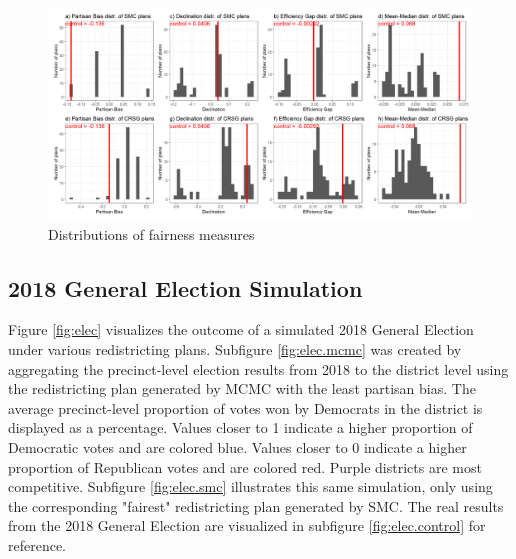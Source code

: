 
\begin{landscape}
    \begin{figure}
     \centering
     \includegraphics{img/fair_hist.png}
     \caption{Distributions of fairness measures}
     \label{fig:fair_hist}
    \end{figure}
   \end{landscape}

\subsection{2018 General Election Simulation}


Figure \ref{fig:elec} visualizes the outcome of a simulated 2018 General Election under various redistricting plans. Subfigure \ref{fig:elec.mcmc} was created by aggregating the precinct-level election results from 2018 to the district level using the redistricting plan generated by MCMC with the least partisan bias. The average precinct-level proportion of votes won by Democrats in the district is displayed as a percentage. Values closer to 1 indicate a higher proportion of Democratic votes and are colored blue. Values closer to 0 indicate a higher proportion of Republican votes and are colored red. Purple districts are most competitive. Subfigure \ref{fig:elec.smc} illustrates this same simulation, only using the corresponding "fairest" redistricting plan generated by SMC. The real results from the 2018 General Election are visualized in subfigure \ref{fig:elec.control} for reference. 